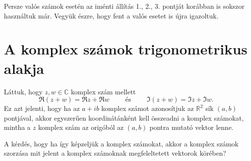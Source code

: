\documentclass[9pt, a4paper, showtrims]{memoir}
\theoremstyle{plain}
\theoremstyle{remark}
\theoremstyle{definition}
\begin{document}
Persze valós számok esetén az iménti állítás 1., 2., 3. pontját korábban is sokszor használtuk már.
Vegyük észre, hogy fent a valós esetet is újra igazoltuk.

\section{A komplex számok trigonometrikus alakja}
Láttuk, hogy $z,w\in\mathbb{C}$ komplex szám mellett
\[
	\Re\left( z+w \right)=\Re z+\Re w
	\qquad
	\text{ és }
	\qquad
	\Im\left( z+w \right)=\Im z+\Im w.
\]
Ez azt jelenti, hogy ha az $a+ib$ komplex számot azonosítjuk az $\mathbb{R}^2$ sík
$\left( a,b \right)$ pontjával,
akkor egyszerűen koordinátánként kell összeadni a komplex számokat, mintha a $z$ komplex szám
az origóból az $\left( a,b \right)$ pontra mutató vektor lenne.

A kérdés, hogy ha így képzeljük a komplex számokat,
akkor a komplex számok szorzása mit jelent a komplex számoknak megfeleltetett vektorok körében?
\end{document}
